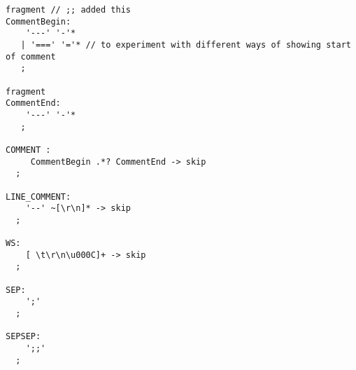\begin{verbatim}
fragment // ;; added this
CommentBegin:
    '---' '-'*
   | '===' '='* // to experiment with different ways of showing start of comment
   ;

fragment 
CommentEnd:
    '---' '-'*
   ;

COMMENT :
     CommentBegin .*? CommentEnd -> skip
  ;

LINE_COMMENT:
    '--' ~[\r\n]* -> skip
  ;

WS:
    [ \t\r\n\u000C]+ -> skip
  ;

SEP:
    ';'
  ;

SEPSEP:
    ';;'
  ;

\end{verbatim}
